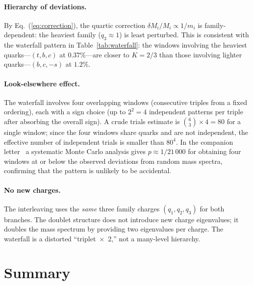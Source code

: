 \documentclass[preprint,12pt]{elsarticle}
\begin{document}
\paragraph{Hierarchy of deviations.}
By Eq.~(\ref{eq:correction}), the quartic correction
$\delta M_i/M_i \propto 1/m_i$ is family-dependent:
the heaviest family ($q_3 \approx 1$) is least perturbed.
This is consistent with the waterfall pattern in
Table~\ref{tab:waterfall}: the windows involving the
heaviest quarks---$(t,b,c)$ at $0.37\%$---are
closer to $K = 2/3$ than those involving lighter
quarks---$(b,c,-s)$ at $1.2\%$.

\paragraph{Look-elsewhere effect.}
The waterfall involves four overlapping windows
(consecutive triples from a fixed ordering), each
with a sign choice (up to $2^2 = 4$ independent
patterns per triple after absorbing the overall sign).
A crude trials estimate is
$\binom{6}{3} \times 4 = 80$ for a single window;
since the four windows share quarks and are not
independent, the effective number of independent
trials is smaller than $80^4$.
In the companion letter~\cite{letter_q2} a systematic
Monte Carlo analysis gives $p \approx 1/21\,000$ for
obtaining four windows at or below the observed deviations
from random mass spectra, confirming that the pattern is
unlikely to be accidental.

\paragraph{No new charges.}
The interleaving uses the \emph{same} three family charges
$(q_1, q_2, q_3)$ for both branches.
The doublet structure does not introduce new
charge eigenvalues; it doubles the mass spectrum by
providing two eigenvalues per charge.
The waterfall is a distorted ``triplet~$\times$~2,''
not a many-level hierarchy.

\section{Summary}
\end{document}
